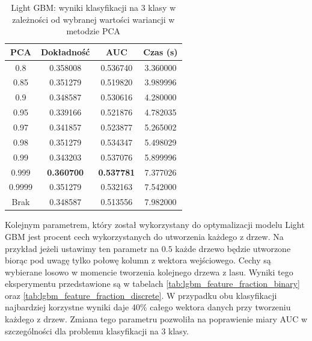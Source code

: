 \documentclass[a4paper, twoside, 11pt, openright]{article}
\begin{document}
\begin{table}[H]
    \centering
    \begin{tabular}{|c|c|c|c|}
    \hline
        \textbf{PCA} & \textbf{Dokładność} & \textbf{AUC} & \textbf{Czas (s)} \\ \hline
0.8                &  0.358008 &  0.536740 &    3.360000 \\ \hline
0.85               &  0.351279 &  0.519820 &    3.989996 \\ \hline
0.9                &  0.348587 &  0.530616 &    4.280000 \\ \hline
0.95               &  0.339166 &  0.521876 &    4.782035 \\ \hline
0.97               &  0.341857 &  0.523877 &    5.265002 \\ \hline
0.98               &  0.351279 &  0.534347 &    5.498029 \\ \hline
0.99               &  0.343203 &  0.537076 &    5.899996 \\ \hline
0.999			   &  \textbf{0.360700} &   \textbf{0.537781} &    7.377026 \\ \hline
0.9999             &  0.351279 &  0.532163 &    7.542000 \\ \hline
Brak                &  0.348587 &  0.513556 &    7.982000 \\ \hline
    \end{tabular}
    \caption{Light GBM: wyniki klasyfikacji na 3 klasy w zależności od wybranej wartości wariancji w metodzie PCA}
    \label{tab:lgbm_pca_discrete}
\end{table}

Kolejnym parametrem, który został wykorzystany do optymalizacji modelu Light GBM jest procent cech wykorzystanych do utworzenia każdego z drzew. Na przykład jeżeli ustawimy ten parametr na $0.5$ każde drzewo będzie utworzone biorąc pod uwagę tylko połowę kolumn z wektora wejściowego. Cechy są wybierane losowo w momencie tworzenia kolejnego drzewa z lasu. Wyniki tego eksperymentu przedstawione są w tabelach \ref{tab:lgbm_feature_fraction_binary} oraz \ref{tab:lgbm_feature_fraction_discrete}. W przypadku obu klasyfikacji najbardziej korzystne wyniki daje 40\% całego wektora danych przy tworzeniu każdego z drzew. Zmiana tego parametru pozwoliła na poprawienie miary AUC w szczególności dla problemu klasyfikacji na 3 klasy.
\end{document}
